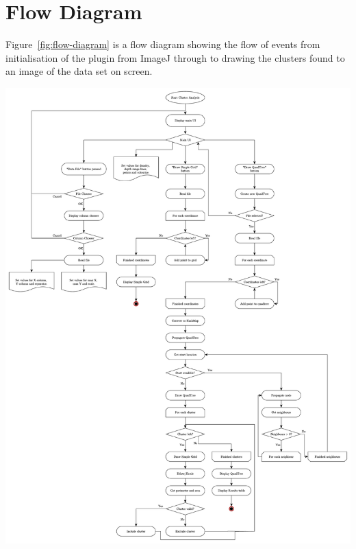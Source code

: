 
\section{Flow Diagram}
\label{sec:flow_diagram}

Figure~\ref{fig:flow-diagram} is a flow diagram showing the flow of events from
initialisation of the plugin from ImageJ through to drawing the clusters found
to an image of the data set on screen.

\includegraphics[height=0.89\textheight]{flow-chart.pdf}\label{fig:flow-diagram}
